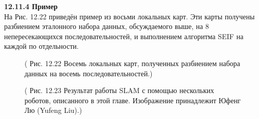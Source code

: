 \documentclass[10pt,a4paper]{article}
\begin{document}
\textbf{12.11.4	Пример}\\

На Рис. 12.22 приведён пример из восьми локальных карт. Эти карты получены разбиением эталонного набора данных, обсуждаемого выше, на 8 непересекающихся последовательностей, и выполнением алгоритма SEIF на каждой по отдельности.

\begin{figure}[H]
	\caption{ ( Рис. 12.22   Восемь локальных карт, полученных разбиением набора данных на восемь последовательностей.) }
	\label{fig:1222orig}
\end{figure}

\begin{figure}[H]
	\caption{ ( Рис. 12.23  Результат работы SLAM с помощью нескольких роботов, описанного в этой главе. Изображение принадлежит Юфенг Лю (Yufeng Liu).) }
	\label{fig:1223orig}
\end{figure}
\end{document}

